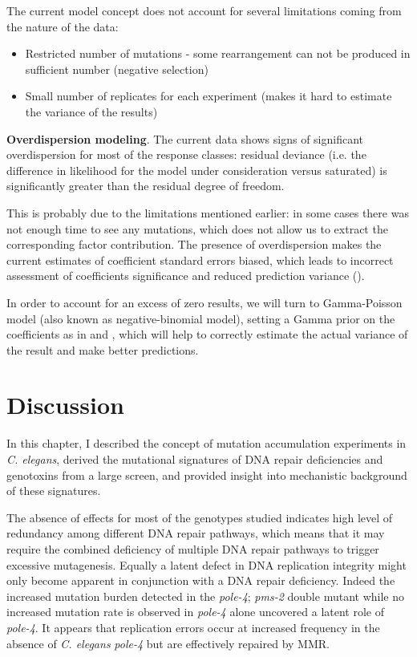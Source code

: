 The current model concept does not account for several limitations coming from the nature of the data:
\begin{itemize}
\itemsep0em
\item Restricted number of mutations - some rearrangement can not be produced in sufficient number (negative selection)
\item Small number of replicates for each experiment (makes it hard to estimate the variance of the results)
\end{itemize}

\textbf{Overdispersion modeling}. The current data shows signs of significant overdispersion for most of the response classes: residual deviance (i.e. the difference in likelihood for the model under consideration versus saturated) is significantly greater than the residual degree of freedom.

This is probably due to the limitations mentioned earlier: in some cases there was not enough time to see any mutations, which does not allow us to extract the corresponding factor contribution. The presence of overdispersion makes the current estimates of coefficient standard errors biased, which leads to incorrect assessment of coefficients significance and reduced prediction variance (\cite{overdisp}).

In order to account for an excess of zero results, we will turn to Gamma-Poisson model (also known as negative-binomial model), setting a Gamma prior on the coefficients as in \cite{Ivek} and \cite{BNB}, which will help to correctly estimate the actual variance of the result and make better predictions.

\section{Discussion}

In this chapter, I described the concept of mutation accumulation experiments in \textit{C. elegans}, derived the mutational signatures of DNA repair deficiencies and genotoxins from a large screen, and provided insight into mechanistic background of these signatures.

The absence of effects for most of the genotypes studied indicates high level of redundancy among different DNA repair pathways, which means that it may require the combined deficiency of multiple DNA repair pathways to trigger excessive mutagenesis. Equally a latent defect in DNA replication integrity might only become apparent in conjunction with a DNA repair deficiency. Indeed the increased mutation burden detected in the \textit{pole-4}; \textit{pms-2} double mutant while no increased mutation rate is observed in \textit{pole-4} alone uncovered a latent role of \textit{pole-4}. It appears that replication errors occur at increased frequency in the absence of \textit{C. elegans} \textit{pole-4} but are effectively repaired by MMR.

